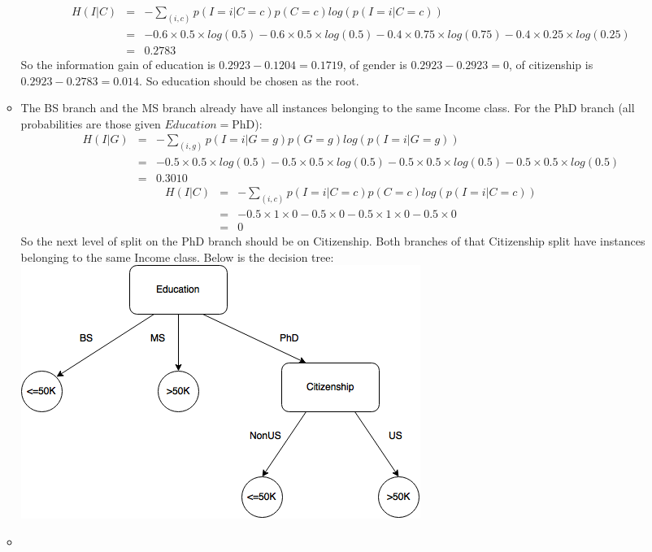 \documentclass[11pt]{article}
\begin{document}
\begin{onehalfspace}
\begin{enumerate}[label=\alph*]
\begin{itemize}
\begin{eqnarray*}
		H(I|C) &=& -\sum_{(i,c)}p(I=i|C=c)p(C=c)log(p(I=i|C=c))\\
			&=& -0.6\times0.5\times log(0.5)-0.6\times0.5\times log(0.5)-0.4\times0.75\times log(0.75)-0.4\times 0.25 \times log(0.25)\\
			&=& 0.2783
		\end{eqnarray*}
		So the information gain of education is $0.2923 - 0.1204 = 0.1719$, of gender is $0.2923 - 0.2923 = 0$, of citizenship is $0.2923 - 0.2783 = 0.014$. So education should be chosen as the root.
		\item
		The BS branch and the MS branch already have all instances belonging to the same Income class. For the PhD branch (all probabilities are those given $Education=\text{PhD}$):\\
		\begin{eqnarray*}
		H(I|G) &=& -\sum_{(i,g)}p(I=i|G=g)p(G=g)log(p(I=i|G=g))\\
			&=& -0.5\times0.5\times log(0.5)-0.5\times0.5\times log(0.5)-0.5\times0.5\times log(0.5)-0.5\times0.5\times log(0.5)\\
			&=& 0.3010
		\end{eqnarray*}
		\begin{eqnarray*}
		H(I|C) &=& -\sum_{(i,c)}p(I=i|C=c)p(C=c)log(p(I=i|C=c))\\
			&=& -0.5\times1\times0-0.5\times0-0.5\times1\times0-0.5\times0\\
			&=& 0
		\end{eqnarray*}
		So the next level of split on the PhD branch should be on Citizenship. Both branches of that Citizenship split have instances belonging to the same Income class. Below is the decision tree:\\
		\includegraphics{dt.png}
		\item

\end{itemize}
\end{enumerate}
\end{onehalfspace}
\end{document}
